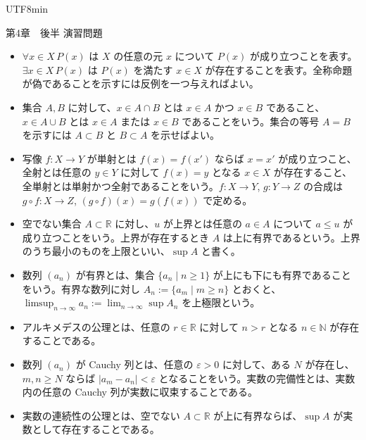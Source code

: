\documentclass{article}
\newcommand{\sectionbox}[1]{%
  \par\bigskip
  \noindent\fbox{\large #1}\par\nobreak\smallskip
}
\newcommand{\defitem}[1]{%
  \item #1
}
\begin{document}
\begin{CJK}{UTF8}{min}

\begin{center}
{\Large 第4章　後半 演習問題}\\
\end{center}

\sectionbox{定義}

\begingroup\small

\begin{itemize}
\setlength{\itemsep}{0.15em}
\setlength{\parsep}{0pt}
\setlength{\topsep}{0.2em}
\setlength{\leftmargin}{1.5em}

\defitem{$\forall x\in X\,P(x)$ は $X$ の任意の元 $x$ について $P(x)$ が成り立つことを表す。$\exists x\in X\,P(x)$ は $P(x)$ を満たす $x\in X$ が存在することを表す。全称命題が偽であることを示すには反例を一つ与えればよい。}

\defitem{集合 $A,B$ に対して、$x\in A\cap B$ とは $x\in A$ かつ $x\in B$ であること、$x\in A\cup B$ とは $x\in A$ または $x\in B$ であることをいう。集合の等号 $A=B$ を示すには $A\subset B$ と $B\subset A$ を示せばよい。}

\defitem{写像 $f:X\to Y$ が単射とは $f(x)=f(x')$ ならば $x=x'$ が成り立つこと、全射とは任意の $y\in Y$ に対して $f(x)=y$ となる $x\in X$ が存在すること、全単射とは単射かつ全射であることをいう。$f:X\to Y$, $g:Y\to Z$ の合成は $g\circ f:X\to Z$, $(g\circ f)(x)=g(f(x))$ で定める。}

\defitem{空でない集合 $A\subset\mathbb{R}$ に対し、$u$ が上界とは任意の $a\in A$ について $a\leq u$ が成り立つことをいう。上界が存在するとき $A$ は上に有界であるという。上界のうち最小のものを上限といい、$\sup A$ と書く。}

\defitem{数列 $(a_n)$ が有界とは、集合 $\{a_n\mid n\geq 1\}$ が上にも下にも有界であることをいう。有界な数列に対し $A_n:=\{a_m\mid m\geq n\}$ とおくと、$\limsup_{n\to\infty}a_n:=\lim_{n\to\infty}\sup A_n$ を上極限という。}

\defitem{アルキメデスの公理とは、任意の $r\in\mathbb{R}$ に対して $n>r$ となる $n\in\mathbb{N}$ が存在することである。}

\defitem{数列 $(a_n)$ が Cauchy 列とは、任意の $\varepsilon>0$ に対して、ある $N$ が存在し、$m,n\geq N$ ならば $|a_m-a_n|<\varepsilon$ となることをいう。実数の完備性とは、実数内の任意の Cauchy 列が実数に収束することである。}

\defitem{実数の連続性の公理とは、空でない $A\subset\mathbb{R}$ が上に有界ならば、$\sup A$ が実数として存在することである。}



\end{itemize}
\end{CJK}
\end{document}
